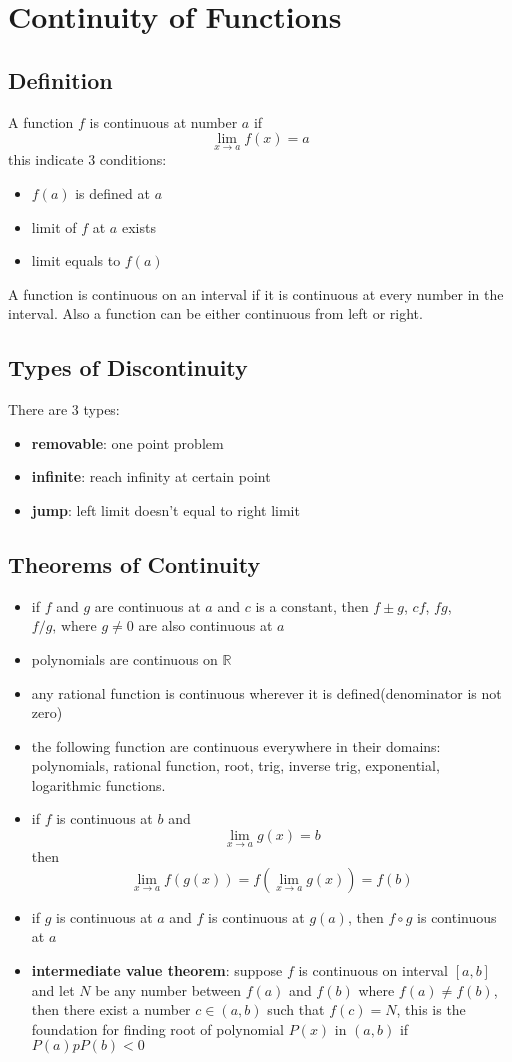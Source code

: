 \documentclass[10pt,a4paper,oneside]{article}
\begin{document}
\section{Continuity of Functions }

\subsection{Definition}
A function $f$ is continuous at number $a$ if
\[
\lim_{x \rightarrow a} f(x) = a
\]
this indicate $3$ conditions:
\begin{itemize}
	\item $f(a)$ is defined at $a$
	\item limit of $f$ at $a$ exists
	\item limit equals to $f(a)$
\end{itemize}
A function is continuous on an interval if it is continuous at every number in the interval. Also a function can be either continuous from left or right.

\subsection{Types of Discontinuity}
There are $3$ types:
\begin{itemize}
	\item \textbf{removable}: one point problem
	\item \textbf{infinite}: reach infinity at certain point
	\item\textbf{jump}: left limit doesn't equal to right limit
\end{itemize}

\subsection{Theorems of Continuity}
\begin{itemize}
	\item if $f$ and $g$ are continuous at $a$ and $c$ is a constant, then $f \pm g$, $cf$, $fg$, $f/g \text{, where } g\neq 0$ are also continuous at $a$
	\item polynomials are continuous on $\mathbb{R}$
	\item any rational function is continuous wherever it is defined(denominator is not zero)
	\item the following function are continuous everywhere in their domains: polynomials, rational function, root, trig, inverse trig, exponential, logarithmic functions.
	\item if $f$ is continuous at $b$ and
	\[
	\lim_{x \rightarrow a} g(x) = b
	\]
	then
	\[
	\lim_{x \rightarrow a} f(g(x)) = f \left(\lim_{x \rightarrow a} g(x)\right) = f(b)
	\]
	\item if $g$ is continuous at $a$ and $f$ is continuous at $g(a)$, then $f\circ g$ is continuous at $a$
	\item \textbf{intermediate value theorem}: suppose $f$ is continuous on interval $[a, b]$ and let $N$ be any number between $f(a)$ and $f(b)$ where $f(a) \neq f(b)$, then there exist a number $c \in (a, b)$ such that $f(c)=N$, this is the foundation for finding root of polynomial $P(x)$ in $(a, b)$ if $P(a)pP(b)<0$
\end{itemize}
\end{document}
